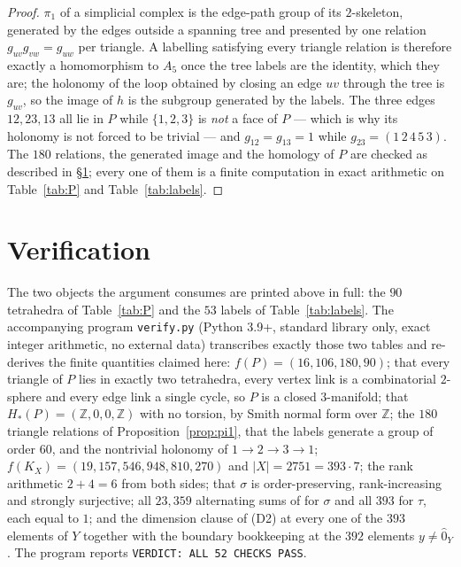 \documentclass[11pt]{amsart}
\theoremstyle{definition}
\theoremstyle{remark}
\newcommand{\Ohat}{\widehat{0}}
\begin{document}
\begin{proof}
$\pi_1$ of a simplicial complex is the edge-path group of its $2$-skeleton, generated by
the edges outside a spanning tree and presented by one relation
$g_{uv}g_{vw}=g_{uw}$ per triangle. A labelling satisfying every triangle relation is
therefore exactly a homomorphism to $A_5$ once the tree labels are the identity, which
they are; the holonomy of the loop obtained by closing an edge $uv$ through the tree is
$g_{uv}$, so the image of $h$ is the subgroup generated by the labels. The three edges
$12,23,13$ all lie in $P$ while $\{1,2,3\}$ is \emph{not} a face of $P$ --- which is why
its holonomy is not forced to be trivial --- and $g_{12}=g_{13}=1$ while
$g_{23}=(1\,2\,4\,5\,3)$. The $180$ relations, the generated image and the homology of
$P$ are checked as described in \S\ref{sec:verify}; every one of them is a finite
computation in exact arithmetic on Table~\ref{tab:P} and Table~\ref{tab:labels}.
\end{proof}

\section{Verification}\label{sec:verify}

The two objects the argument consumes are printed above in full: the $90$ tetrahedra of
Table~\ref{tab:P} and the $53$ labels of Table~\ref{tab:labels}. The accompanying program
\texttt{verify.py} (Python 3.9+, standard library only, exact integer arithmetic, no
external data) transcribes exactly those two tables and re-derives the finite quantities
claimed here: $f(P)=(16,106,180,90)$; that every triangle of $P$ lies in exactly two
tetrahedra, every vertex link is a combinatorial $2$-sphere and every edge link a single
cycle, so $P$ is a closed $3$-manifold; that $H_*(P)=(\mathbb Z,0,0,\mathbb Z)$ with no
torsion, by Smith normal form over $\mathbb Z$; the $180$ triangle relations of
Proposition~\ref{prop:pi1}, that the labels generate a group of order $60$, and the
nontrivial holonomy of $1\to2\to3\to1$; $f(K_X)=(19,157,546,948,810,270)$ and
$|X|=2751=393\cdot7$; the rank arithmetic $2+4=6$ from both sides; that $\sigma$ is
order-preserving, rank-increasing and strongly surjective; all $23{,}359$ alternating sums
of \cite[Definition 3.5]{Stapledon} for $\sigma$ and all $393$ for $\tau$, each equal to
$1$; and the dimension clause of (D2) at every one of the $393$ elements of $Y$ together
with the boundary bookkeeping at the $392$ elements $y\ne\Ohat_Y$. The program reports
\texttt{VERDICT: ALL 52 CHECKS PASS}.
\end{document}
